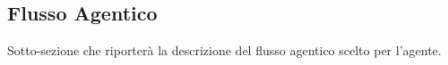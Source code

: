 \subsection{Flusso Agentico}

Sotto-sezione che riporterà la descrizione del flusso agentico scelto per l'agente.
